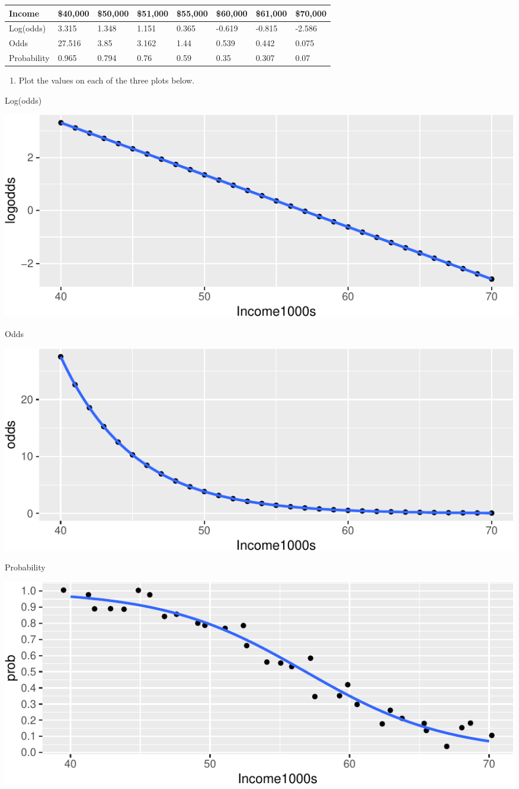 \documentclass[]{article}
\providecommand{\tightlist}{%
  \setlength{\itemsep}{0pt}\setlength{\parskip}{0pt}}
\begin{document}
\begin{longtable}[]{@{}llllllll@{}}
\toprule
Income & \$40,000 & \$50,000 & \$51,000 & \$55,000 & \$60,000 & \$61,000
& \$70,000\tabularnewline
\midrule
\endhead
Log(odds) & 3.315 & 1.348 & 1.151 & 0.365 & -0.619 & -0.815 &
-2.586\tabularnewline
Odds & 27.516 & 3.85 & 3.162 & 1.44 & 0.539 & 0.442 &
0.075\tabularnewline
Probability & 0.965 & 0.794 & 0.76 & 0.59 & 0.35 & 0.307 &
0.07\tabularnewline
\bottomrule
\end{longtable}

\begin{enumerate}
\def\labelenumi{\arabic{enumi}.}
\setcounter{enumi}{5}
\tightlist
\item
  Plot the values on each of the three plots below.
\end{enumerate}

Log(odds)

\includegraphics{17-class-exercise_answers_files/figure-latex/unnamed-chunk-5-1.pdf}

Odds

\includegraphics{17-class-exercise_answers_files/figure-latex/unnamed-chunk-6-1.pdf}

Probability

\includegraphics{17-class-exercise_answers_files/figure-latex/unnamed-chunk-7-1.pdf}
\end{document}
